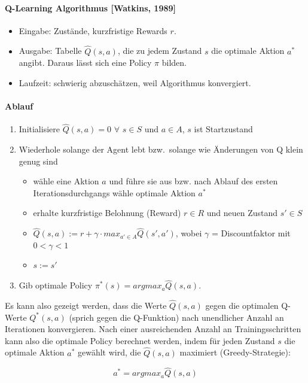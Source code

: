 \paragraph{Q-Learning Algorithmus [Watkins, 1989]}
\begin{itemize}
  \item Eingabe: Zustände, kurzfristige Rewards $r$.
  \item Ausgabe: Tabelle  $\hat{Q}(s,a)$, die zu jedem Zustand $s$ die optimale 
  Aktion $a^*$ angibt. Daraus lässt sich eine Policy $\pi$ bilden.
  \item Laufzeit: schwierig abzuschätzen, weil Algorithmus konvergiert.
\end{itemize}

\paragraph{Ablauf}
\begin{enumerate}
  \item Initialisiere $\hat{Q}(s,a) = 0$ $\forall$ $s \in S$ und $a \in A$, $s$ 
  ist Startzustand
  \item Wiederhole solange der Agent lebt bzw.\ solange wie Änderungen von Q 
  klein genug sind
  \begin{itemize}
    \item wähle eine Aktion $a$ und führe sie aus bzw. nach Ablauf des ersten
    Iterationsdurchgangs wähle optimale Aktion $a^*$
    \item erhalte kurzfristige Belohnung (Reward) $r \in R$ und neuen Zustand 
    $s' \in S$
    \item $\hat{Q}(s,a) := r + \gamma \cdot max_{a' \in A}\hat{Q}(s',a')$,
    wobei $\gamma$ = Discountfaktor mit  $0 < \gamma < 1$
    \item $s := s'$
  \end{itemize}
  \item Gib optimale Policy  $\pi^*(s) = argmax_{a}\hat{Q}(s,a)$.
\end{enumerate}

Es kann also gezeigt werden, dass die Werte $\hat{Q}(s,a)$ gegen die optimalen 
Q-Werte $Q^*(s,a)$ (sprich gegen die Q-Funktion) nach unendlicher Anzahl an 
Iterationen konvergieren. Nach einer ausreichenden Anzahl an Trainingsschritten 
kann also die optimale Policy berechnet werden, indem für jeden Zustand $s$ die 
optimale Aktion $a^*$ gewählt wird, die $\hat{Q}(s,a)$ maximiert (Greedy-Strategie):

\[ 
a^* = argmax_{a}\hat{Q}(s,a)
\]

